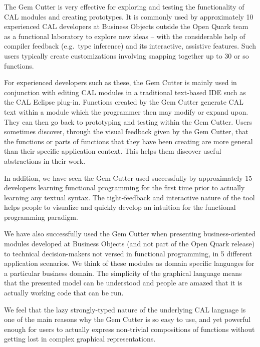 \documentclass[preprint]{sigplanconf}
\begin{document}
The Gem Cutter is very effective for exploring and
testing the functionality of CAL modules and creating prototypes. It
is commonly used by approximately 10 experienced CAL developers at Business Objects
outside the Open Quark team as a functional laboratory to explore new
ideas -- with the considerable help of compiler feedback (e.g.\ type
inference) and its interactive, assistive features. Such users typically
create customizations involving snapping together up to 30 or so
functions. 

For experienced developers such as these, the Gem Cutter is 
mainly used in conjunction with editing CAL modules in a traditional
text-based IDE such as the CAL Eclipse plug-in.
Functions created by the Gem Cutter generate CAL text within a module
which the programmer then may modify or expand
upon. They can then go back to prototyping and testing within the 
Gem Cutter. Users sometimes discover, through the visual feedback given
by the Gem Cutter, that the functions or parts of functions that they
have been creating are more general than their specific application context.
This helps them discover useful abstractions in their work. 

In addition, we have seen the Gem Cutter used successfully by
approximately 15 developers learning functional programming for the
first time prior to actually learning any textual syntax. The
tight-feedback and interactive nature of the tool helps people to
visualize and quickly develop an intuition for the functional
programming paradigm.

We have also successfully used the Gem Cutter when presenting
business-oriented modules developed at Business Objects (and not part
of the Open Quark release) to technical decision-makers not versed in
functional programming, in 5 different application scenarios. We think
of these modules as domain specific languages for a particular
business domain. The simplicity of the graphical language means that the
presented model can be understood and people are amazed that it is
actually working code that can be run.

We feel that the lazy strongly-typed nature of the underlying CAL
language is one of the main reasons why the Gem Cutter
is so easy to use, and yet powerful enough for users to actually
express non-trivial compositions of functions without getting lost in
complex graphical representations. 
\end{document}
